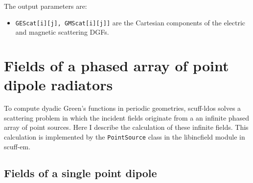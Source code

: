 \documentclass[letterpaper]{article}
\begin{document}
The output parameters are:

\begin{itemize}
 \item \texttt{GEScat[i][j], GMScat[i][j]]} are the Cartesian components of the 
       electric and magnetic scattering DGFs.
\end{itemize}

\appendix
\newpage 
\section{Fields of a phased array of point dipole radiators}
\label{DipoleFieldsAppendix}

To compute dyadic Green's functions in periodic geometries,
{\sc scuff-ldos} solves a scattering problem in which the
incident fields originate from a an infinite phased array
of point sources. Here I describe the calculation of these
infinite fields. This calculation is implemented by the 
\texttt{PointSource} 
class in the {\sc libincfield} module in {\sc scuff-em}.

\subsection*{Fields of a single point dipole}
\end{document}
